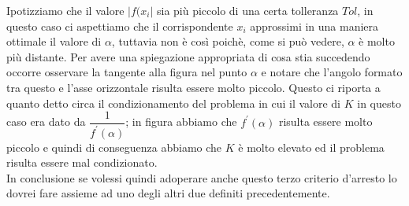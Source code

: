 \documentclass[12pt, a4paper]{book}
\theoremstyle{definition}
\begin{document}
\begin{flushleft}
\begin{figure}[ht!]
\end{figure}

Ipotizziamo che  il valore $|f(x_{i}|$ sia più piccolo di una certa tolleranza $Tol$, in questo caso ci aspettiamo che il corrispondente $x_{i}$ approssimi in una maniera ottimale il valore di $\alpha$, tuttavia non è così poichè, come si può vedere, $\alpha$ è molto più distante.
Per avere una spiegazione appropriata di cosa stia succedendo occorre osservare la tangente alla figura nel punto $\alpha$ e notare che l'angolo formato tra questo e l'asse orizzontale risulta essere molto piccolo.  Questo ci riporta a quanto detto circa il condizionamento del problema in cui il valore di $K$ in questo caso era dato da $\dfrac{1}{f^{'}(\alpha)}$; in figura abbiamo che $f^{'}(\alpha)$ risulta essere molto piccolo e quindi di conseguenza abbiamo che $K$ è molto elevato ed il problema risulta essere mal condizionato.\\

In conclusione se volessi quindi adoperare anche questo terzo criterio d'arresto lo dovrei fare assieme ad uno degli  altri due definiti precedentemente.
\end{flushleft}
\end{document}
